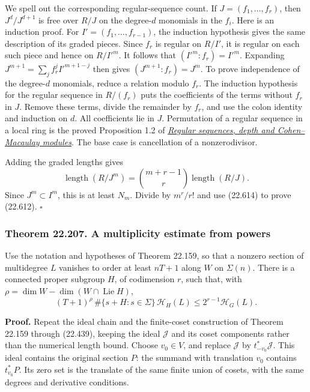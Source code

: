 \documentclass[
  11pt,
  a4paper,
]{article}
\begin{document}
We spell out the corresponding regular-sequence count. If
\(J=(f_1,\ldots,f_r)\), then \(J^d/J^{d+1}\) is free over \(R/J\) on the
degree-\(d\) monomials in the \(f_i\). Here is an induction proof. For
\(I'=(f_1,\ldots,f_{r-1})\), the induction hypothesis gives the same
description of its graded pieces. Since \(f_r\) is regular on \(R/I'\),
it is regular on each such piece and hence on \(R/I'^m\). It follows
that \((I'^m:f_r)=I'^m\). Expanding \(J^{m+1}=\sum_jf_r^jI'^{m+1-j}\)
then gives \((J^{m+1}:f_r)=J^m\). To prove independence of the
degree-\(d\) monomials, reduce a relation modulo \(f_r\). The induction
hypothesis for the regular sequence in \(R/(f_r)\) puts the coefficients
of the terms without \(f_r\) in \(J\). Remove these terms, divide the
remainder by \(f_r\), and use the colon identity and induction on \(d\).
All coefficients lie in \(J\). Permutation of a regular sequence in a
local ring is the proved Proposition 1.2 of
\href{https://kokunoyumeto.github.io/open-math-courses-public/courses/AG-CA/AG-CA-12.html}{\emph{Regular sequences, depth and
Cohen--Macaulay modules}}. The base case is cancellation of a
nonzerodivisor.

Adding the graded lengths gives \[
 \operatorname{length}(R/J^m)
   =\binom{m+r-1}{r}\operatorname{length}(R/J).
 \tag{22.615}
\] Since \(J^m\subset I^m\), this is at least \(N_m\). Divide by
\(m^r/r!\) and use (22.614) to prove (22.612). \(\square\)

\subsubsection{Theorem 22.207. A multiplicity estimate from
powers}\label{theorem-22.207.-a-multiplicity-estimate-from-powers}

Use the notation and hypotheses of Theorem 22.159, so that a nonzero
section of multidegree \(L\) vanishes to order at least \(nT+1\) along
\(W\) on \(\Sigma(n)\). There is a connected proper subgroup \(H\), of
codimension \(r\), such that, with
\(\rho=\dim W-\dim(W\cap\operatorname{Lie}H)\), \[
 (T+1)^\rho\,\#\{s+H:s\in\Sigma\}\,
                 \mathcal H_H(L)
       \le2^{r-1}\mathcal H_G(L).
 \tag{22.616}
\]

\textbf{Proof.} Repeat the ideal chain and the finite-coset construction
of Theorem 22.159 through (22.439), keeping the ideal \(\mathcal J\) and
its coset components rather than the numerical length bound. Choose
\(v_0\in V\), and replace \(\mathcal J\) by \(t_{-v_0}^*\mathcal J\).
This ideal contains the original section \(P\): the summand with
translation \(v_0\) contains \(t_{v_0}^*P\). Its zero set is the
translate of the same finite union of cosets, with the same degrees and
derivative conditions.
\end{document}
